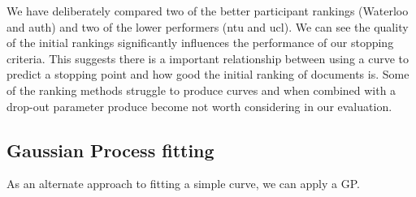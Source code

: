 \begin{table}[H]
\caption{Comparison of different of sample method using curve fitting for different CLEF 2017 runs. Sample size = 3. Results are taken as averages over all topics for search method. with 0.5\% drop-out}

\end{table}

We have deliberately compared two of the better participant rankings (Waterloo and auth) and two of the lower performers (ntu and ucl). We can see the quality of the initial rankings significantly influences the performance of our stopping criteria. This suggests there is a important relationship between using a curve to predict a stopping point and how good the initial ranking of documents is. Some of the ranking methods struggle to produce curves and when combined with a drop-out parameter produce become not worth considering in our evaluation.


\subsection{Gaussian Process fitting}

As an alternate approach to fitting a simple curve, we can apply a GP.

